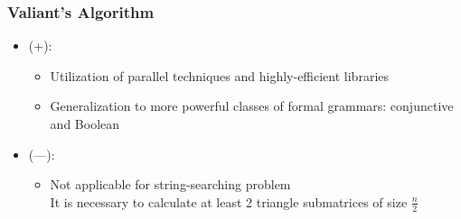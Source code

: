 \documentclass[xcolor=table]{beamer}
\begin{document}
\begin{frame}[fragile] \frametitle{Valiant's Algorithm}

    \begin{itemize}
    \item (+):
    \begin{itemize}
        \item Utilization of parallel techniques and highly-efficient libraries
        \item Generalization to more powerful classes of formal grammars: conjunctive and Boolean
    \end{itemize}
    \item (---):
    \begin{itemize}
      \item Not applicable for string-searching problem \\
      It is necessary to calculate at least 2 triangle submatrices of size $\frac{n}{2}$ 
    \end{itemize}
    \end{itemize}


\end{frame}
\end{document}
